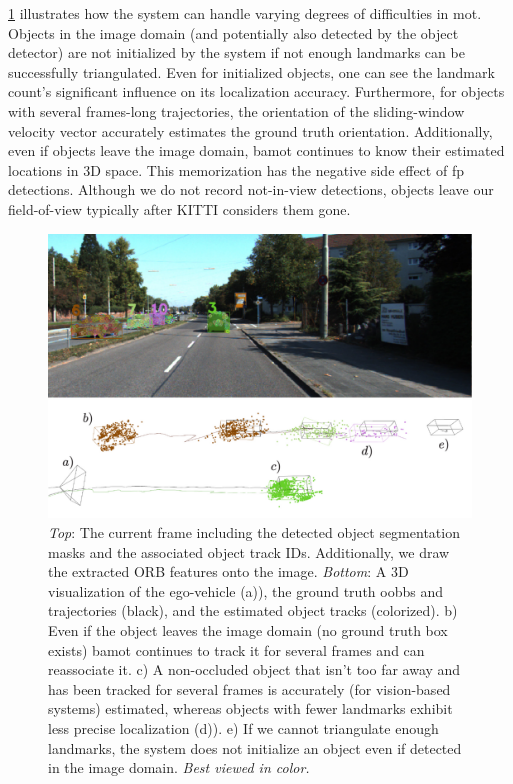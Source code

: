 \documentclass[headsepline, hidelinks, footsepline, footinclude=false, oneside, fontsize=11pt, paper=a4, listof=totoc, bibliography=totoc]{scrbook}
\begin{document}
\cref{fig:qualitative-scene} illustrates how the system can handle varying degrees of difficulties in \gls{mot}. Objects in the image domain (and potentially also detected by the object detector)
are not initialized by the system if not enough landmarks can be successfully triangulated. 
Even for initialized objects, one can see the landmark count's significant influence on its localization accuracy. 
Furthermore, for objects with several frames-long trajectories, the orientation of the sliding-window velocity vector accurately estimates the ground truth orientation.
Additionally, even if objects leave the image domain, \gls{bamot} continues to know their estimated locations in 3D space. 
This memorization has the negative side effect of \gls{fp} detections. Although we do not record not-in-view detections, objects leave our field-of-view typically after KITTI considers them gone.

\begin{figure}[htbp]
\centering
\includegraphics[width=\textwidth]{figures/qualitative-scene-stacked.pdf}
\caption{\label{fig:qualitative-scene}\emph{Top}: The current frame including the detected object segmentation masks and the associated object track IDs. Additionally, we draw the extracted ORB features onto the image. \emph{Bottom}: A 3D visualization of the ego-vehicle (a)), the ground truth \glspl{oobb} and trajectories (black), and the estimated object tracks (colorized). b) Even if the object leaves the image domain (no ground truth box exists) \gls{bamot} continues to track it for several frames and can reassociate it. c) A non-occluded object that isn't too far away and has been tracked for several frames is accurately (for vision-based systems) estimated, whereas objects with fewer landmarks exhibit less precise localization (d)). e) If we cannot triangulate enough landmarks, the system does not initialize an object even if detected in the image domain. \emph{Best viewed in color.}}
\end{figure}
\end{document}
